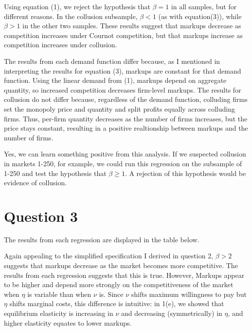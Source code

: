 \documentclass{article}
\begin{document}
Using equation (1), we reject the hypothesis that ${\beta=1}$ in all samples, but for different reasons. In the collusion subsample, ${\beta<1}$ (as with equation(3)), while ${\beta>1}$ in the other two samples. These results suggest that markups decrease as competition increases under Cournot competition, but that markups increase as competition increases under collusion.

The results from each demand function differ because, as I mentioned in interpreting the results for equation (3), markups are constant for that demand function. Using the linear demand from (1), markups depend on aggregate quantity, so increased competition decreases firm-level markups. The results for collusion do not differ because, regardless of the demand function, colluding firms set the monopoly price and quantity and split profits equally across colluding firms. Thus, per-firm quantity decreases as the number of firms increases, but the price stays constant, resulting in a positive realtionship between markups and the number of firms.

Yes, we can learn something positive from this analysis. If we suspected collusion in markets 1-250, for example, we could run this regression on the subsample of 1-250 and test the hypothesis that ${\beta\geq1}$. A rejection of this hypothesis would be evidence of collusion.


\section*{Question 3}
The results from each regression are displayed in the table below.
\begin{center}
  
\end{center}
Again appealing to the simplified specification I derived in question 2, ${\beta>2}$ suggests that markups decrease as the market becomes more competitive. The results from each regression suggests that this is true. However, Markups appear to be higher and depend more strongly on the competitiveness of the market when $\eta$ is variable than when $\nu$ is. Since $\nu$ shifts maximum willingness to pay but $\eta$ shifts marginal costs, this difference is intuitive: in 1(e), we showed that equilibrium elasticity is increasing in $\nu$ and decreasing (symmetrically) in $\eta$, and higher elasticity equates to lower markups.

\end{document}
